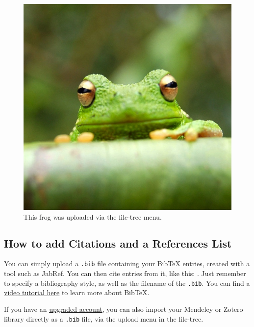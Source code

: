 \documentclass{article}
\begin{document}
\begin{figure}
    \centering
    \includegraphics[width=0.25\linewidth]{Figures/frog.jpg}
    \caption{\label{fig:frog}This frog was uploaded via the file-tree menu.}
\end{figure}


\subsection{How to add Citations and a References List}

You can simply upload a \verb|.bib| file containing your BibTeX entries, created with a tool such as JabRef. You can then cite entries from it, like this: \cite{greenwade93}. Just remember to specify a bibliography style, as well as the filename of the \verb|.bib|. You can find a \href{https://www.overleaf.com/help/97-how-to-include-a-bibliography-using-bibtex}{video tutorial here} to learn more about BibTeX.

If you have an \href{https://www.overleaf.com/user/subscription/plans}{upgraded account}, you can also import your Mendeley or Zotero library directly as a \verb|.bib| file, via the upload menu in the file-tree.




\end{document}

